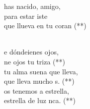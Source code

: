 \documentclass[12pt]{article}
\begin{document}
\begin{multicols*}{2}
\begin{cancion}%
	\begin{chorus}%
	has nacido, amigo,\\
	para estar iste\\
	que llueva en tu coran (**)\\
	\end{chorus}%
	\jump\\
	e dóndeienes ojos,\\
	ne ojos tu triza (**)\\
\jump
	tu alma suena  que lleva,\\
	que lleva mucho s. (**)\\
\jump
	os tenemos a estrella,\\
	 estrella de luz nca. (**)\\
\end{cancion}%


\end{multicols*}
\end{document}
